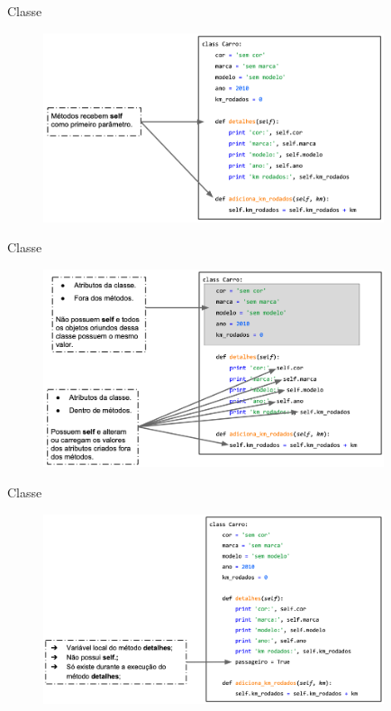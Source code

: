 \documentclass{beamer}
\begin{document}
\begin{frame}{Classe}
    \begin{figure}[H]
        \includegraphics[width=10cm]{Theme/Logos/self_1.png}
    \end{figure}
\end{frame}

\begin{frame}{Classe}
    \begin{figure}[H]
        \includegraphics[width=10cm]{Theme/Logos/self_2.png}
    \end{figure}
\end{frame}

\begin{frame}{Classe}
    \begin{figure}[H]
        \includegraphics[width=10cm]{Theme/Logos/self_3.png}
    \end{figure}
\end{frame}
\end{document}
